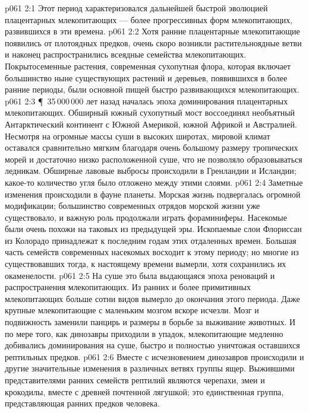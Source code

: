 \vs p061 2:1 Этот период характеризовался дальнейшей быстрой эволюцией плацентарных млекопитающих --- более прогрессивных форм млекопитающих, развившихся в эти времена.
\vs p061 2:2 Хотя ранние плацентарные млекопитающие появились от плотоядных предков, очень скоро возникли растительноядные ветви и наконец распространились всеядные семейства млекопитающих. Покрытосеменные растения, современная сухопутная флора, которая включает большинство ныне существующих растений и деревьев, появившихся в более ранние периоды, были основной пищей быстро развивающихся млекопитающих.
\vs p061 2:3 \P\ 35\,000\,000 лет назад началась эпоха доминирования плацентарных млекопитающих. Обширный южный сухопутный мост воссоединял необъятный Антарктический континент с Южной Америкой, южной Африкой и Австралией. Несмотря на огромные массы суши в высоких широтах, мировой климат оставался сравнительно мягким благодаря очень большому размеру тропических морей и достаточно низко расположенной суше, что не позволяло образовываться ледникам. Обширные лавовые выбросы происходили в Гренландии и Исландии; какое\hyp{}то количество угля было отложено между этими слоями.
\vs p061 2:4 Заметные изменения происходили в фауне планеты. Морская жизнь подвергалась огромной модификации; большинство современных отрядов морской жизни уже существовало, и важную роль продолжали играть фораминиферы. Насекомые были очень похожи на таковых из предыдущей эры. Ископаемые слои Флориссан из Колорадо принадлежат к последним годам этих отдаленных времен. Большая часть семейств современных насекомых восходит к этому периоду; но многие из существовавших тогда, к настоящему времени вымерли, хотя сохранились их окаменелости.
\vs p061 2:5 На суше это была выдающаяся эпоха реноваций и распространения млекопитающих. Из ранних и более примитивных млекопитающих больше сотни видов вымерло до окончания этого периода. Даже крупные млекопитающие с маленьким мозгом вскоре исчезли. Мозг и подвижность заменили панцирь и размеры в борьбе за выживание животных. И по мере того, как динозавры приходили в упадок, млекопитающие медленно добивались доминирования на суше, быстро и полностью уничтожая оставшихся рептильных предков.
\vs p061 2:6 Вместе с исчезновением динозавров происходили и другие значительные изменения в различных ветвях группы ящер. Выжившими представителями ранних семейств рептилий являются черепахи, змеи и крокодилы, вместе с древней почтенной лягушкой; это единственная группа, представляющая ранних предков человека.
